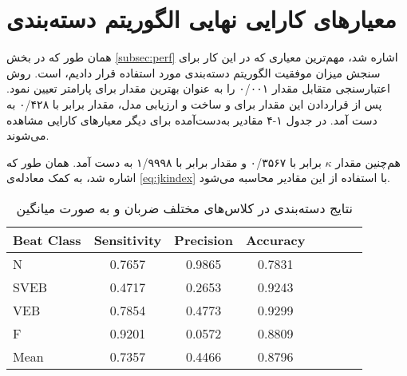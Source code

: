 \section{معیارهای کارایی نهایی الگوریتم دسته‌بندی}
همان طور که در بخش \ref{subsec:perf} اشاره شد، مهم‌ترین معیاری که در این کار برای سنجش میزان موفقیت الگوریتم دسته‌بندی مورد استفاده قرار دادیم،    است. روش اعتبارسنجی متقابل مقدار  ۰/۰۰۱ را به عنوان بهترین مقدار برای پارامتر  تعیین نمود. پس از قراردادن این مقدار برای  و ساخت و ارزیابی مدل، مقدار   برابر با ۰/۴۲۸ به دست آمد. در جدول ۱-۴ مقادیر به‌دست‌آمده برای دیگر معیارهای کارایی مشاهده می‌شوند.

هم‌چنین مقدار $\kappa$ برابر با ۰/۳۵۶۷ و مقدار  برابر با ۱/۹۹۹۸ به دست آمد. همان طور که اشاره شد،   به کمک معادله‌ی \ref{eq:jkindex} با استفاده از این مقادیر محاسبه می‌شود.


\begin{table}
\begin{center}
\begin{latin} 
\begin{tabular}{l*{6}{c}r}
Beat Class              & Sensitivity & Precision & Accuracy  \\
\hline
N & 0.7657 & 0.9865 & 0.7831  \\
SVEB            & 0.4717 & 0.2653 & 0.9243  \\
VEB           & 0.7854 & 0.4773 & 0.9299  \\
F    & 0.9201 & 0.0572 & 0.8809  \\
Mean    & 0.7357 & 0.4466 & 0.8796  \\
\end{tabular}
\end{latin}
\caption{نتایج دسته‌بندی در کلاس‌های مختلف ضربان و به صورت میانگین}
\end{center}
\label{table:results}
\end{table}





